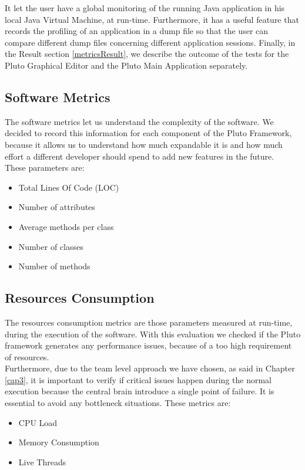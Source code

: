 It let the user have a global monitoring of the running Java application in his local Java Virtual Machine, at run-time. Furthermore, it has a useful feature that records the profiling of an application in a dump file so that the user can compare different dump files concerning different application sessions.
Finally, in the Result section \ref{metricsResult}, we describe the outcome of the tests for the Pluto Graphical Editor and the Pluto Main Application separately.

\subsection{Software Metrics}

The software metrics let us understand the complexity of the software.
We decided to record this information for each component of the Pluto Framework, because it allows us to understand how much expandable it is and how much effort a different developer should spend to add new features in the future.
\\

These parameters are:

\begin{itemize}
\item Total Lines Of Code (LOC)
\item Number of attributes
\item Average methods per class
\item Number of classes
\item Number of methods
\end{itemize}

\subsection{Resources Consumption}

The resources consumption metrics are those parameters measured at run-time, during the execution of the software.
With this evaluation we checked if the Pluto framework generates any performance issues, because of a too high requirement of resources. 
\\
Furthermore, due to the team level approach we have chosen, as said in Chapter \ref{cap3}, it is important to verify if critical issues happen during the normal execution because the central brain introduce a single point of failure. It is essential to avoid any bottleneck situations.
These metrics are:

\begin{itemize}
\item CPU Load
\item Memory Consumption
\item Live Threads
\end{itemize}

